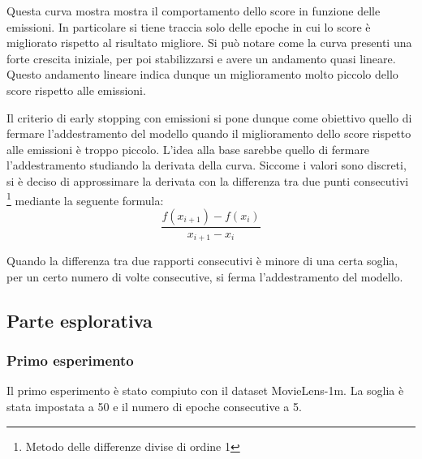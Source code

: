 \noindent Questa curva mostra mostra il comportamento dello score in funzione delle emissioni. In particolare si tiene traccia solo delle epoche in cui lo score è migliorato rispetto al risultato migliore.
Si può notare come la curva presenti una forte crescita iniziale, per poi stabilizzarsi e avere un andamento quasi lineare.
Questo andamento lineare indica dunque un miglioramento molto piccolo dello score rispetto alle emissioni.

\noindent Il criterio di early stopping con emissioni si pone dunque come obiettivo quello di fermare l'addestramento del modello quando il miglioramento dello score rispetto alle emissioni è troppo piccolo.
L'idea alla base sarebbe quello di fermare l'addestramento studiando la derivata della curva. Siccome i valori sono discreti, si è deciso di approssimare la derivata con la differenza tra due punti consecutivi \footnote{Metodo delle differenze divise di ordine 1}{} mediante la seguente formula:
\begin{equation}
    \frac{f(x_{i+1}) - f(x_i)}{x_{i+1} - x_i}
\end{equation}

\noindent Quando la differenza tra due rapporti consecutivi è minore di una certa soglia, per un certo numero di volte consecutive, si ferma l'addestramento del modello.

\subsection{Parte esplorativa}
\subsubsection{Primo esperimento}

Il primo esperimento è stato compiuto con il dataset MovieLens-1m. La soglia è stata impostata a 50 e il numero di epoche consecutive a 5.

